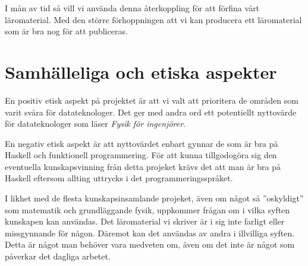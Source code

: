 \documentclass[12pt,a4paper]{article}
\begin{document}
I mån av tid så vill vi använda denna återkoppling för att förfina vårt läromaterial. Med den större förhoppningen att vi kan producera ett läromaterial som är bra nog för att publiceras.

\section{Samhälleliga och etiska aspekter}

En positiv etisk aspekt på projektet är att vi valt att prioritera de områden som varit svåra för datateknologer. Det ger med andra ord ett potentiellt nyttovärde för datateknologer som läser \textit{Fysik för ingenjörer}.

En negativ etisk aspekt är att nyttovärdet enbart gynnar de som är bra på Haskell och funktionell programmering. För att kunna tillgodogöra sig den eventuella kunskapsvinning från detta projeket krävs det att man är bra på Haskell eftersom allting uttrycks i det programmeringsspråket.

I likhet med de flesta kunskapsinsamlande projeket, även om något så ''oskyldigt'' som matematik och grundläggande fysik, uppkommer frågan om i vilka syften kunskapen kan användas. Det läromaterial vi skriver är i sig inte farligt eller missgynnande för någon. Däremot kan det användas av andra i illvilliga syften. Detta är något man behöver vara medveten om, även om det inte är något som påverkar det dagliga arbetet.

\end{document}

